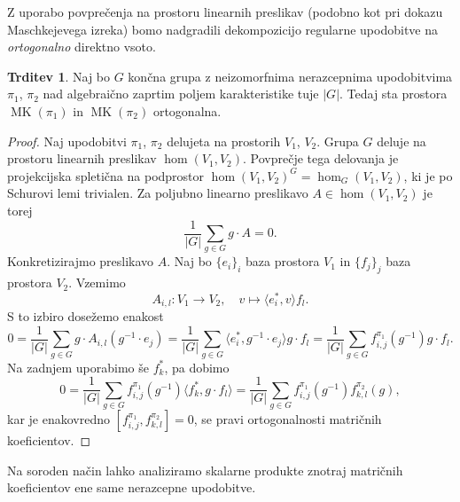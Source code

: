 \documentclass[11pt]{book}
\DeclareMathOperator\MK{MK}
\theoremstyle{definition}
\theoremstyle{zgled}
\theoremstyle{odprtproblem}
\theoremstyle{domacanaloga}
\newenvironment{dokaz}
    {\color{siva}\begin{proof}}
    {\end{proof}}
\theoremstyle{izrek}
\newtheorem*{trditev}{Trditev}
\begin{document}
Z uporabo povprečenja na prostoru linearnih preslikav (podobno kot pri dokazu Maschkejevega izreka) bomo nadgradili dekompozicijo regularne upodobitve na \emph{ortogonalno} direktno vsoto.

\begin{trditev}
Naj bo $G$ končna grupa z neizomorfnima nerazcepnima upodobitvima $\pi_1$, $\pi_2$ nad algebraično zaprtim poljem karakteristike tuje $|G|$. Tedaj sta prostora $\MK(\pi_1)$ in $\MK(\pi_2)$ ortogonalna.
\end{trditev}
\begin{dokaz}
Naj upodobitvi $\pi_1$, $\pi_2$ delujeta na prostorih $V_1$, $V_2$. Grupa $G$ deluje na prostoru linearnih preslikav $\hom(V_1, V_2)$. Povprečje tega delovanja je projekcijska spletična na podprostor $\hom(V_1, V_2)^G = \hom_G(V_1, V_2)$, ki je po Schurovi lemi trivialen. Za poljubno linearno preslikavo $A \in \hom(V_1, V_2)$ je torej
\[
    \frac{1}{|G|} \sum_{g \in G} g \cdot A = 0.
\]
Konkretizirajmo preslikavo $A$. Naj bo $\{ e_i \}_i$ baza prostora $V_1$ in $\{ f_j \}_j$ baza prostora $V_2$. Vzemimo
\[
    A_{i,l} \colon V_1 \to V_2, \quad
    v \mapsto \langle e_i^*, v \rangle f_l.
\]
S to izbiro dosežemo enakost
\[
    0 = \frac{1}{|G|} \sum_{g \in G} g \cdot A_{i,l}(g^{-1} \cdot e_j) =
    \frac{1}{|G|} \sum_{g \in G} \langle e_i^*, g^{-1} \cdot e_j \rangle g \cdot f_l =
    \frac{1}{|G|} \sum_{g \in G} f_{i,j}^{\pi_1}(g^{-1}) g \cdot f_l.
\]
Na zadnjem uporabimo še $f_k^*$, pa dobimo
\[
    0 = \frac{1}{|G|} \sum_{g \in G} f_{i,j}^{\pi_1}(g^{-1}) \langle f_k^*, g \cdot f_l \rangle =
    \frac{1}{|G|} \sum_{g \in G} f_{i,j}^{\pi_1}(g^{-1}) f_{k,l}^{\pi_2}(g),
\]
kar je enakovredno $[ f_{i,j}^{\pi_1}, f_{k,l}^{\pi_2} ] = 0$, se pravi ortogonalnosti matričnih koeficientov.
\end{dokaz}

Na soroden način lahko analiziramo skalarne produkte znotraj matričnih koeficientov ene same nerazcepne upodobitve.
\end{document}
